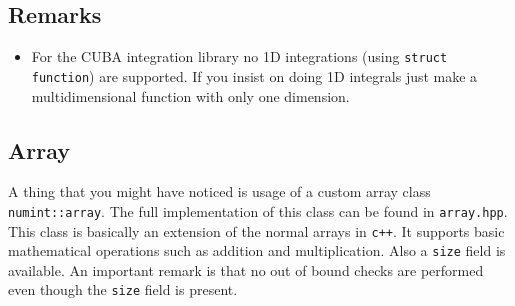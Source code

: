 \subsection{Remarks}
\begin{itemize}
\item For the CUBA integration library no 1D integrations (using \texttt{struct function}) are supported. If you insist on doing 1D integrals just make a multidimensional function with only one dimension.
\end{itemize}
\subsection{Array}
A thing that you might have noticed is usage of a custom array class \texttt{numint::array}. The full implementation of this class can be found in \texttt{array.hpp}. This class is basically an extension of the normal arrays in \texttt{c++}. It supports basic mathematical operations such as addition and multiplication. Also a \texttt{size} field is available. An important remark is that no out of bound checks are performed even though the \texttt{size} field is present.